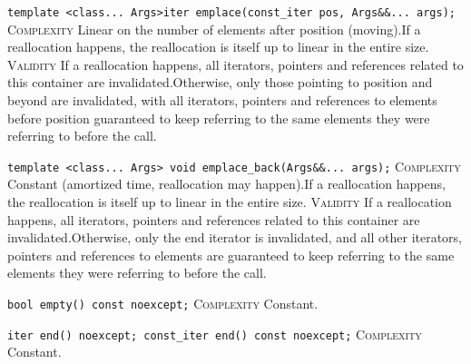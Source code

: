 \noindent{}\hspace*{0.25em}\lstinline[basicstyle=\ttfamily\color{corange}]{template <class... Args>iter emplace(const_iter pos, Args&&... args);} \textsc{Complexity} Linear on the number of elements after position (moving).If a reallocation happens, the reallocation is itself up to linear in the entire size. \textsc{Validity} If a reallocation happens, all iterators, pointers and references related to this container are invalidated.Otherwise, only those pointing to position and beyond are invalidated, with all iterators, pointers and references to elements before position guaranteed to keep referring to the same elements they were referring to before the call.\\\vspace{-0.6em}

\noindent{}\hspace*{0.25em}\lstinline[basicstyle=\ttfamily\color{corange}]{template <class... Args> void emplace_back(Args&&... args);} \textsc{Complexity} Constant (amortized time, reallocation may happen).If a reallocation happens, the reallocation is itself up to linear in the entire size. \textsc{Validity} If a reallocation happens, all iterators, pointers and references related to this container are invalidated.Otherwise, only the end iterator is invalidated, and all other iterators, pointers and references to elements are guaranteed to keep referring to the same elements they were referring to before the call.\\\vspace{-0.6em}

\noindent{}\hspace*{0.25em}\lstinline[basicstyle=\ttfamily\color{cgreen}]{bool empty() const noexcept;} \textsc{Complexity} Constant.\\\vspace{-0.6em}

\noindent{}\hspace*{0.25em}\lstinline[basicstyle=\ttfamily\color{cgreen}]{iter end() noexcept; const_iter end() const noexcept;} \textsc{Complexity} Constant.\\\vspace{-0.6em}

